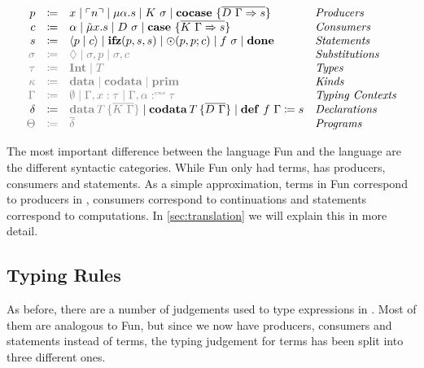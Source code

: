 \begin{definition}
  \[
    \begin{array}{rcll}
      p & \coloneqq & x \mid \lit{n} \mid \mu\alpha.s \mid K\ \sigma \mid \cocase{\overline{D\ \Gamma \Rightarrow s}} & \emph{Producers}\\
      c & \coloneqq & \alpha \mid \tilde{\mu}x.s \mid D\ \sigma \mid \case{\overline{K\ \Gamma \Rightarrow s}}& \emph{Consumers}\\
      s & \coloneqq & \cut{p}{c} \mid \ifz{p}{s}{s} \mid \odot(p, p; c) \mid f\ \sigma\mid \done & \emph{Statements}\\
      \grey{\sigma} & \grey{\coloneqq} & \grey{\nil \mid \sigma, p \mid \sigma, c} & \emph{Substitutions}\\
      \grey{\tau} & \grey{\coloneqq} & \grey{\tyint \mid T} & \emph{Types}\\
      \grey{\kappa} & \grey{\coloneqq} & \grey{\mathbf{data}\mid\mathbf{codata}\mid\mathbf{prim}} & \emph{Kinds}\\
      \grey{\Gamma} & \grey{\coloneqq} & \grey{\emptyset \mid \Gamma, x : \tau \mid \Gamma, \alpha \cnt \tau} & \emph{Typing Contexts} \\
      \delta & \coloneqq & \grey{\data{T}{\overline{K\ \Gamma}}} \mid \codata{T}{\overline{D\ \Gamma }} \mid \defi{f\ \Gamma}{s} & \emph{Declarations}\\
      \grey{\Theta} & \grey{\coloneqq} & \grey{\overline{\delta}} & \emph{Programs}\\
    \end{array}
  \]
\end{definition}
The most important difference between the language Fun and the language \targetlang{} are the different syntactic categories.
While Fun only had terms, \targetlang{} has producers, consumers and statements. 
As a simple approximation, terms in Fun correspond to producers in \targetlang{}, consumers correspond to continuations and statements correspond to computations. 
In \cref{sec:translation} we will explain this in more detail.

\subsection{Typing Rules}
\label{subsec:core:typing-rules}

As before, there are a number of judgements used to type expressions in \targetlang{}. 
Most of them are analogous to Fun, but since we now have producers, consumers and statements instead of terms, the typing judgement for terms has been split into three different ones. 

